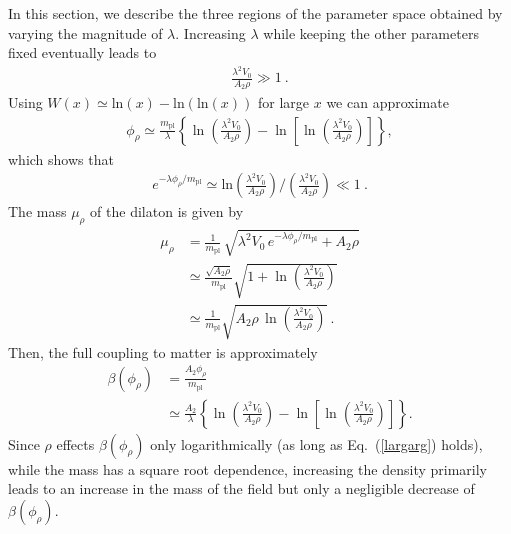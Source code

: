 \documentclass[aps,pra,twocolumn,floatfix,superscriptaddress,nofootinbib,showpacs,a4paper,balancelastpage,twoside]{revtex4-2}
\begin{document}
In this section, we describe the three regions of the parameter space obtained by varying the magnitude of $\lambda$.
Increasing $\lambda$ while keeping the other parameters fixed eventually leads to
\begin{align}
    \frac{\lambda^2 V_0}{A_2 \rho} \gg 1\>. \label{largarg}
\end{align}
Using $W(x)\simeq \text{ln}(x)- \text{ln} (\text{ln}(x))$ for large $x$ we can approximate 
\begin{align}
    \phi_{\rho} \simeq \frac{m_{\text{pl}}}{\lambda}\left\{\ln\left(\frac{\lambda^2 V_0}{A_2 \rho}\right)-\ln\left[\ln\left(\frac{\lambda^2 V_0}{A_2 \rho}\right)\right]\right\}, \label{fracfrac}
\end{align}
which shows that
\begin{align}
    e^{-\lambda \phi_{\rho} /m_{\text{pl}} } \simeq \text{ln}\left(\frac{\lambda^2 V_0}{A_2 \rho}\right)\bigg/\left(\frac{\lambda^2 V_0}{A_2 \rho}\right) \ll 1\>.
\end{align}
The mass $\mu_{\rho}$ of the dilaton is given by~\cite{Brax:2022uyh}
\begin{align}
\mu_{\rho}&=\frac{1}{m_{\text{pl}}}\,\sqrt{\lambda^2 V_0\,e^{- \lambda \phi_{\rho}/m_{\text{pl}}}+A_2\rho} \nonumber\\
&\simeq \frac{\sqrt{A_2 \rho}}{m_{\text{pl}}}\sqrt{1+ \ln\left(\frac{\lambda^2 V_0}{A_2 \rho}\right)} \nonumber\\
&\simeq \frac{1}{m_{\text{pl}}}\sqrt{A_2 \rho\,\ln\left(\frac{\lambda^2 V_0}{A_2 \rho}\right)}\>.  \label{mass}
\end{align}
Then, the full coupling to matter is approximately
\begin{align}
    \beta(\phi_{\rho}) &= \frac{A_2 \phi_{\rho}}{m_{\text{pl}}} \nonumber\\
    &\simeq \frac{A_2}{\lambda}\left\{\ln\left(\frac{\lambda^2 V_0}{A_2 \rho}\right)-\ln\left[\ln\left(\frac{\lambda^2 V_0}{A_2 \rho}\right)\right]\right\}.\label{beta}
\end{align}
Since $\rho$ effects $\beta(\phi_{\rho})$ only logarithmically (as long as Eq.~(\ref{largarg}) holds), while the mass has a square root dependence, increasing the density primarily leads to an increase in the mass of the field but only a negligible decrease of $\beta(\phi_\rho).$ 
\end{document}
